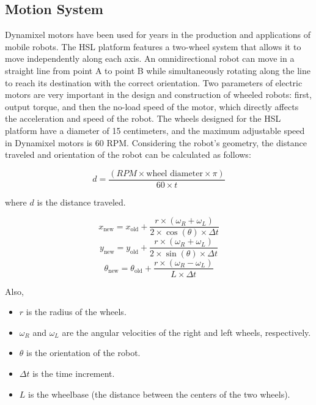 \documentclass[conference]{IEEEtran}
\begin{document}
\subsection{Motion System}
Dynamixel motors have been used for years in the production and applications of mobile robots. The HSL platform features a two-wheel system that allows it to move independently along each axis. An omnidirectional robot can move in a straight line from point A to point B while simultaneously rotating along the line to reach its destination with the correct orientation. Two parameters of electric motors are very important in the design and construction of wheeled robots: first, output torque, and then the no-load speed of the motor, which directly affects the acceleration and speed of the robot. The wheels designed for the HSL platform have a diameter of 15 centimeters, and the maximum adjustable speed in Dynamixel motors is 60 RPM. Considering the robot's geometry, the distance traveled and orientation of the robot can be calculated as follows:

\begin{equation}
d = \frac{(RPM \times \text{wheel diameter} \times \pi)}{60 \times t} \label{eq:distance}
\end{equation}

where \( d \) is the distance traveled.

\begin{equation}
x_{\text{new}} = x_{\text{old}} + \frac{r \times (\omega_R + \omega_L)}{2 \times \cos(\theta) \times \Delta t}
\end{equation}
\begin{equation}
y_{\text{new}} = y_{\text{old}} + \frac{r \times (\omega_R + \omega_L)}{2 \times \sin(\theta) \times \Delta t}
\end{equation}
\begin{equation}
\theta_{\text{new}} = \theta_{\text{old}} + \frac{r \times (\omega_R - \omega_L)}{L \times \Delta t}
\end{equation}

Also,
\begin{itemize}
    \item \( r \) is the radius of the wheels.
    \item \( \omega_R \) and \( \omega_L \) are the angular velocities of the right and left wheels, respectively.
    \item \( \theta \) is the orientation of the robot.
    \item \( \Delta t \) is the time increment.
    \item \( L \) is the wheelbase (the distance between the centers of the two wheels).
\end{itemize}
\end{document}
